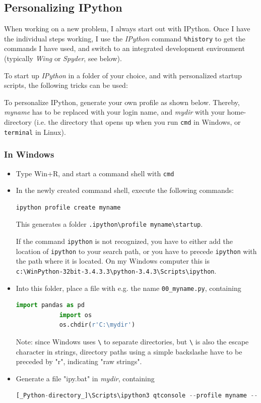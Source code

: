 \subsection{Personalizing IPython}

When working on a new problem, I always start out with IPython. Once
I have the individual steps working, I use the \emph{IPython} command \lstinline{%history} to get the commands I have used, and switch to an integrated development environment (typically \emph{Wing} or \emph{Spyder}, see below).

To start up \emph{IPython} in a folder of your choice, and with personalized startup scripts, the following tricks can be used:

To personalize IPython, generate your own profile as shown below. Thereby, \emph{myname} has to be replaced with your login name, and \emph{mydir} with your home-directory (i.e. the directory that opens up when you run \lstinline{cmd} in Windows, or \lstinline{terminal} in Linux).

\subsubsection{In Windows}

\begin{itemize}
  \item Type Win+R, and start a command shell with \lstinline{cmd}
  \item In the newly created command shell, execute the following commands:
        \begin{lstlisting}[language=Python]
            ipython profile create myname
        \end{lstlisting}
        This generates a folder \lstinline{.ipython\profile myname\startup}.

        If the command \lstinline{ipython} is not recognized, you have to either add the location of \lstinline{ipython} to your search path, or you have to precede \lstinline{ipython} with the path where it is located. On my Windows computer this is \lstinline{c:\WinPython-32bit-3.4.3.3\python-3.4.3\Scripts\ipython}.

  \item Into this folder, place a file with e.g. the name \lstinline{00_myname.py}, containing
        \begin{lstlisting}[language=Python]
            import pandas as pd
            import os
            os.chdir(r'C:\mydir')
        \end{lstlisting}
        Note: since Windows uses \lstinline{\} to separate directories, but \lstinline{\} is also the escape character in strings, directory paths using a simple backslashe have to be preceded by "r", indicating "raw strings".
  \item Generate a file "ipy.bat" in \emph{mydir}, containing
      \begin{lstlisting}[language=Python]
      [_Python-directory_]\Scripts\ipython3 qtconsole --profile myname --pylab=inline
      \end{lstlisting}
\end{itemize}

